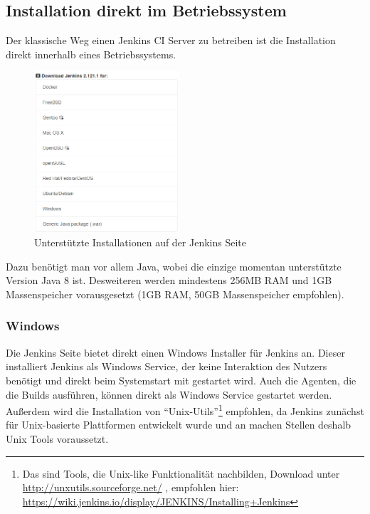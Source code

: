 \subsection{Installation direkt im Betriebssystem}
Der klassische Weg einen Jenkins CI Server zu betreiben ist die Installation direkt innerhalb eines Betriebssystems.
\begin{figure}
  \begin{center}
    \includegraphics[width=0.48\textwidth]{./Images/Jenkins_installation_and_setup.png}
  \end{center}
  \caption{Unterstützte Installationen auf der Jenkins Seite\cite{jenkins-download}}\label{fig:Jenkins_installation_and_setup}
\end{figure}
Dazu benötigt man vor allem Java, wobei die einzige momentan unterstützte Version Java 8 ist.\cite{jenkins-java} Desweiteren werden mindestens 256MB RAM und 1GB  Massenspeicher vorausgesetzt (1GB RAM, 50GB Massenspeicher empfohlen).\cite{jenkins-installing}
\subsubsection*{Windows}
Die Jenkins Seite bietet direkt einen Windows Installer für Jenkins an. Dieser installiert Jenkins als Windows Service, der keine Interaktion des Nutzers benötigt und direkt beim Systemstart mit gestartet wird. Auch die Agenten, die die Builds ausführen, können direkt als Windows Service gestartet werden. \cite{jenkins-windows}\\
Außerdem wird die Installation von "`Unix-Utils"'\footnote{Das sind Tools, die Unix-like Funktionalität nachbilden, Download unter \url{http://unxutils.sourceforge.net/} , empfohlen hier: \url{https://wiki.jenkins.io/display/JENKINS/Installing+Jenkins}} empfohlen, da Jenkins zunächst für Unix-basierte Plattformen entwickelt wurde und an machen Stellen deshalb Unix Tools voraussetzt. 
